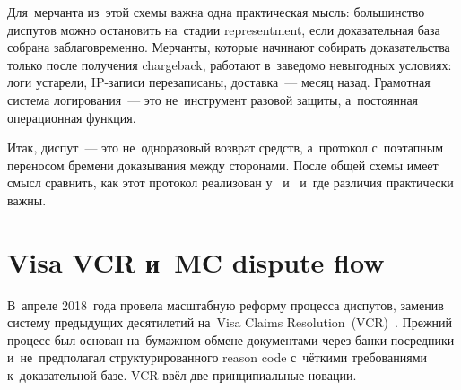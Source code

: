 
Для~мерчанта из~этой схемы важна одна практическая мысль: большинство
диспутов можно остановить на~стадии representment, если доказательная
база собрана заблаговременно. Мерчанты, которые начинают собирать
доказательства только после получения chargeback, работают в~заведомо
невыгодных условиях: логи устарели, IP-записи перезаписаны, доставка~---
месяц назад. Грамотная система логирования~--- это не~инструмент разовой
защиты, а~постоянная операционная функция.


Итак, диспут~--- это не~одноразовый возврат средств, а~протокол
с~поэтапным переносом бремени доказывания между сторонами.
После общей схемы имеет смысл сравнить, как этот протокол
реализован у~ и~ и~где различия
практически важны.

\section{Visa VCR и~MC dispute flow}
\label{sec:disputes-vcr-mc}

В~апреле 2018~года  провела масштабную реформу процесса
диспутов, заменив систему предыдущих десятилетий на~Visa Claims
Resolution~(VCR)~. Прежний процесс был основан
на~бумажном обмене документами через банки-посредники и~не~предполагал
структурированного reason code с~чёткими требованиями к~доказательной
базе. VCR ввёл две принципиальные новации.

